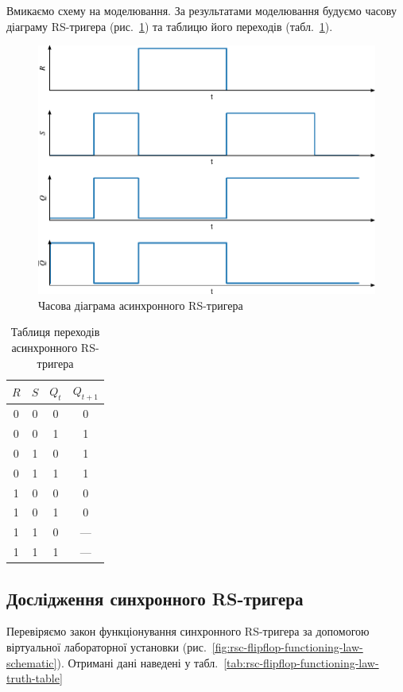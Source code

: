 \documentclass[a4paper,oneside,DIV=10,12pt]{scrartcl}
\begin{document}
			Вмикаємо схему на моделювання. За результатами моделювання будуємо часову діаграму RS-тригера (рис.~\ref{fig:rs-flipflop-dynamic-mode-plot}) та таблицю його переходів (табл.~\ref{tab:rs-flipflop-excitation-table}).
			
			\begin{figure}[!htbp]
			\centering
				\includegraphics[width = \textwidth]{plots/02-pdf/01-rs-edited.pdf}
			\caption{Часова діаграма асинхронного RS-тригера}
			\label{fig:rs-flipflop-dynamic-mode-plot}
			\end{figure}
			
			\begin{table}[!htbp]
			\centering
				\begin{tabular}{cccc}
					\toprule
						$R$ & $S$ & $Q_t$ & $Q_{t + 1}$\\
					\midrule
						0 & 0 & 0 & 0\\
						0 & 0 & 1 & 1\\
						0 & 1 & 0 & 1\\
						0 & 1 & 1 & 1\\
						1 & 0 & 0 & 0\\
						1 & 0 & 1 & 0\\
						1 & 1 & 0 & —\\
						1 & 1 & 1 & —\\
					\bottomrule
				\end{tabular}
			\caption{Таблиця переходів асинхронного RS-тригера}
			\label{tab:rs-flipflop-excitation-table}
			\end{table}
			
		\subsection{Дослідження синхронного RS-тригера}
			Перевіряємо закон функціонування синхронного RS-тригера за допомогою віртуальної лабораторної установки (рис.~\ref{fig:rsc-flipflop-functioning-law-schematic}). Отримані дані наведені у табл.~\ref{tab:rsc-flipflop-functioning-law-truth-table}
			
\end{document}
